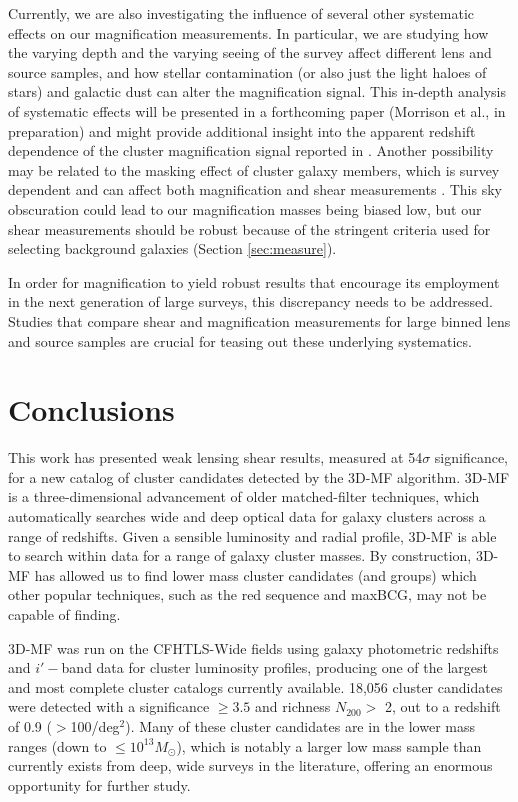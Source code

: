 Currently, we are also investigating the influence of several other systematic effects on our magnification measurements. In particular, we are studying how the varying depth and the varying seeing of the survey affect different lens and source samples, and how stellar contamination (or also just the light haloes of stars) and galactic dust can alter the magnification signal. This in-depth analysis of systematic effects will be presented in a forthcoming paper (Morrison et al., in preparation) and might provide additional insight into the apparent redshift dependence of the cluster magnification signal reported in \citet{Ford14}. Another possibility may be related to the masking effect of cluster galaxy members, which is survey dependent and can affect both magnification and shear measurements \citep{Simet14}. This sky obscuration could lead to our magnification masses being biased low, but our shear measurements should be robust because of the stringent criteria used for selecting background galaxies (Section \ref{sec:measure}).

In order for magnification to yield robust results that encourage its employment in the next generation of large surveys, this discrepancy needs to be addressed. Studies that compare shear and magnification measurements for large binned lens and source samples are crucial for teasing out these underlying systematics. 


\section{Conclusions}

This work has presented weak lensing shear results, measured at 54$\sigma$ significance, for a new catalog of cluster candidates detected by the \ac{3D-MF} algorithm. \ac{3D-MF} is a three-dimensional advancement of older matched-filter techniques, which automatically searches wide and deep optical data for galaxy clusters across a range of redshifts. Given a sensible luminosity and radial profile, \ac{3D-MF} is able to search within data for a range of galaxy cluster masses. By construction, \ac{3D-MF} has allowed us to find lower mass cluster candidates (and groups) which other popular techniques, such as the red sequence and maxBCG, may not be capable of finding. 

\ac{3D-MF} was run on the \ac{CFHTLS}-Wide fields using galaxy photometric redshifts and $i'-$band data for cluster luminosity profiles, producing one of the largest and most complete cluster catalogs currently available. 18,056 cluster candidates were detected with a significance $\ge 3.5$ and richness $N_{200} >$ 2, out to a redshift of 0.9 ($>$100/deg$^2$). Many of these cluster candidates are in the lower mass ranges (down to $\leq 10^{13} M_{\odot}$), which is notably a larger low mass sample than currently exists from deep, wide surveys in the literature, offering an enormous opportunity for further study. 

